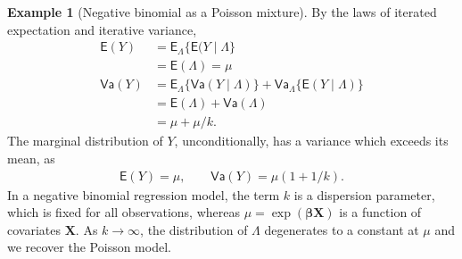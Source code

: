 \documentclass[
  11pt,
  letterpaper,
]{scrbook}
\theoremstyle{definition}
\theoremstyle{definition}
\newtheorem{example}{Example}[chapter]
\theoremstyle{definition}
\theoremstyle{plain}
\theoremstyle{plain}
\theoremstyle{remark}
\begin{document}
\begin{example}[Negative binomial as a Poisson
mixture]
By the laws of iterated expectation and iterative variance,
\begin{align*}
\mathsf{E}(Y) &= \mathsf{E}_{\Lambda}\{\mathsf{E}(Y \mid \Lambda\} \\& = \mathsf{E}(\Lambda) = \mu\\
\mathsf{Va}(Y) &= \mathsf{E}_{\Lambda}\{\mathsf{Va}(Y \mid \Lambda)\} + \mathsf{Va}_{\Lambda}\{\mathsf{E}(Y \mid \Lambda)\} \\&= \mathsf{E}(\Lambda) + \mathsf{Va}(\Lambda) \\&= \mu + \mu/k.
\end{align*} The marginal distribution of \(Y\), unconditionally, has a
variance which exceeds its mean, as \begin{align*}
\mathsf{E}(Y) = \mu, \qquad \mathsf{Va}(Y) = \mu (1+1/k).
\end{align*} In a negative binomial regression model, the term \(k\) is
a dispersion parameter, which is fixed for all observations, whereas
\(\mu = \exp(\boldsymbol{\beta}\mathbf{X})\) is a function of covariates
\(\mathbf{X}\). As \(k \to \infty\), the distribution of \(\Lambda\)
degenerates to a constant at \(\mu\) and we recover the Poisson model.

\end{example}
\end{document}
